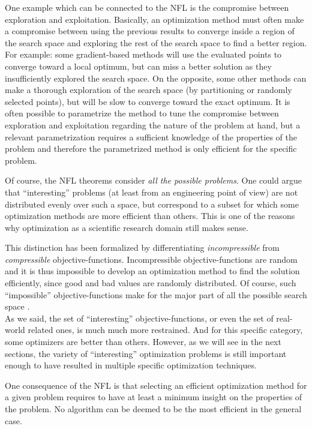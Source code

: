 One example which can be connected to the NFL is the compromise between exploration and exploitation. Basically, an optimization method must often make a compromise between using the previous results to converge inside a region of the search space and exploring the rest of the search space to find a better region.
For example: some gradient-based methods will use the evaluated points to converge toward a local optimum, but can miss a better solution as they insufficiently explored the search space. On the opposite, some other methods can make a thorough exploration of the search space (by partitioning or randomly selected points), but will be slow to converge toward the exact optimum.
It is often possible to parametrize the method to tune the compromise between exploration and exploitation regarding the nature of the problem at hand, but a relevant parametrization requires a sufficient knowledge of the properties of the problem and therefore the parametrized method is only efficient for the specific problem.

Of course, the NFL theorems consider \emph{all the possible problems}. One could argue that \enquote{interesting} problems (at least from an engineering point of view) are not distributed evenly over such a space, but correspond to a subset for which some optimization methods are more efficient than others. This is one of the reasons why optimization as a scientific research domain still makes sense. 

This distinction has been formalized by differentiating \emph{incompressible} from \emph{compressible} objective-functions. Incompressible objective-functions are random and it is thus impossible to develop an optimization method to find the solution efficiently, since good and bad values are randomly distributed. Of course, such \enquote{impossible} objective-functions make for the major part of all the possible search space \cite{English:3-540-45356-3_7}.\\
As we said, the set of \enquote{interesting} objective-functions, or even the set of real-world related ones, is much much more restrained. And for this specific category, some optimizers are better than others. 
However, as we will see in the next sections, the variety of \enquote{interesting} optimization problems is still important enough to have resulted in multiple specific optimization techniques.

One consequence of the NFL is that selecting an efficient optimization method for a given problem requires to have at least a minimum insight on the properties of the problem. No algorithm can be deemed to be the most efficient in the general case.

